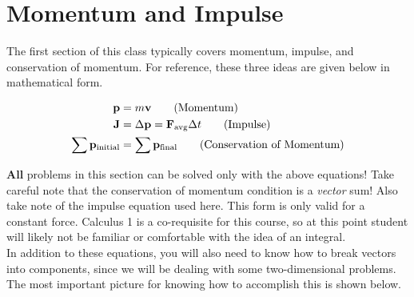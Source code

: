 \chapter{Momentum and Impulse}

The first section of this class typically covers momentum, impulse, and 
conservation of momentum.  For reference, these three ideas are given below
in mathematical form.

\begin{align}
    \mathbf{p} &= m\mathbf{v} \tag{Momentum} \\
    \mathbf{J} &= \Delta \mathbf{p} = \mathbf{F}_{\text{avg}}\Delta t \tag{Impulse} \\
    \sum \mathbf{p}_{\text{initial}} &= \sum \mathbf{p}_{\text{final}} \tag{Conservation of Momentum}
\end{align}


\textbf{All} problems in this section can be solved only with the above equations! 
Take careful note that the conservation of momentum condition is a \textit{vector} sum! Also take note
of the impulse equation used here. This form is only valid for a constant force.  Calculus 1
is a co-requisite for this course, so at this point student will likely not be familiar
or comfortable with the idea of an integral.\\

In addition to these equations, you will also need to know how to break vectors into components, 
since we will be dealing with some two-dimensional problems. The most important picture
for knowing how to accomplish this is shown below. \\

\vspace{2em}

\begin{center}
\end{center}

